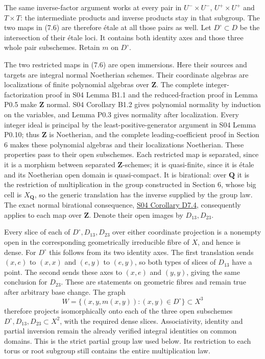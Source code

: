 \documentclass[11pt,a4paper,openany]{report}
\newcounter{none}
\begin{document}
The same inverse-factor argument works at every pair in \(U^-\times U^-\), \(U^+\times U^+\) and \(T\times T\): the intermediate products and inverse products stay in that subgroup. The two maps in (7.6) are therefore étale at all those pairs as well. Let \(D^\circ\subset D\) be the intersection of their étale loci. It contains both identity axes and those three whole pair subschemes. Retain \(m\) on \(D^\circ\).

The two restricted maps in (7.6) are open immersions. Here their sources and targets are integral normal Noetherian schemes. Their coordinate algebras are localizations of finite polynomial algebras over \(\mathbf Z\). The complete integer-factorization proof in S04 Lemma B1.1 and the reduced-fraction proof in Lemma P0.5 make \(\mathbf Z\) normal. S04 Corollary B1.2 gives polynomial normality by induction on the variables, and Lemma P0.3 gives normality after localization. Every integer ideal is principal by the least-positive-generator argument in S04 Lemma P0.10; thus \(\mathbf Z\) is Noetherian, and the complete leading-coefficient proof in Section 6 makes these polynomial algebras and their localizations Noetherian. These properties pass to their open subschemes. Each restricted map is separated, since it is a morphism between separated \(\mathbf Z\)-schemes; it is quasi-finite, since it is étale and its Noetherian open domain is quasi-compact. It is birational: over \(\mathbf Q\) it is the restriction of multiplication in the group constructed in Section 6, whose big cell is \(X_{\mathbf Q}\), so the generic translation has the inverse supplied by the group law. The exact normal birational consequence, \href{https://github.com/KokunoYumeto/open-math-courses/blob/main/docs/courses/AG-RG/AG-RG-S04.md}{S04 Corollary D7.4}, consequently applies to each map over \(\mathbf Z\). Denote their open images by \(D_{13},D_{23}\).

Every slice of each of \(D^\circ,D_{13},D_{23}\) over either coordinate projection is a nonempty open in the corresponding geometrically irreducible fibre of \(X\), and hence is dense. For \(D^\circ\) this follows from its two identity axes. The first translation sends \((x,e)\) to \((x,x)\) and \((e,y)\) to \((e,y)\), so both types of slices of \(D_{13}\) have a point. The second sends these axes to \((x,e)\) and \((y,y)\), giving the same conclusion for \(D_{23}\). These are statements on geometric fibres and remain true after arbitrary base change. The graph \[
W=\{(x,y,m(x,y)):(x,y)\in D^\circ\}\subset X^3
\] therefore projects isomorphically onto each of the three open subschemes \(D^\circ,D_{13},D_{23}\subset X^2\), with the required dense slices. Associativity, identity and partial inversion remain the already verified integral identities on common domains. This is the strict partial group law used below. Its restriction to each torus or root subgroup still contains the entire multiplication law.
\end{document}
